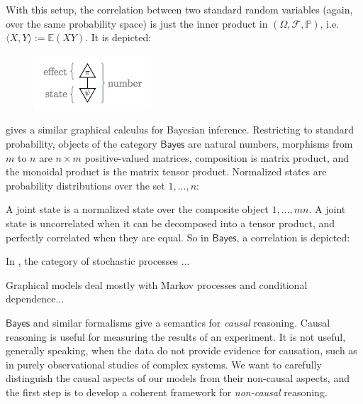 \documentclass{sig-alternate-05-2015}
\theoremstyle{plain}
\theoremstyle{plain}
\theoremstyle{remark}
\newcommand{\Cat}[1]{\mathsf{#1}}
\def\Bayes{\Cat{Bayes}}
\begin{document}
With this setup, the correlation between two standard random variables (again, over the same probability space) is just the inner product in $(\Omega, \mathcal{F}, \mathbb{P})$, i.e. $\langle X, Y \rangle := \mathbb{E}(XY)$. It is depicted:
\begin{figure}[h!]
\centering
\includegraphics{innerproduct}
\end{figure}

\cite{coecke_spekkens} gives a similar graphical calculus for Bayesian inference. Restricting to standard probability, objects of the category $\Bayes$ are natural numbers, morphisms from $m$ to $n$ are $n \times m$ positive-valued matrices, composition is matrix product, and the monoidal product is the matrix tensor product. Normalized states are probability distributions over the set ${1, ..., n}$:

\begin{figure}[h!]
\label{bob_normalized_state}
\end{figure}

A joint state is a normalized state over the composite object ${1, ..., mn}$. A joint state is uncorrelated when it can be decomposed into a tensor product, and perfectly correlated when they are equal. So in $\Bayes$, a correlation is depicted:

\begin{figure}[h!]
\label{bob_uncorrelated_state}
\end{figure}

\begin{figure}[h!]
\label{bob_correlated_state}
\end{figure}

In \cite{lawvere}, the category of stochastic processes ...

Graphical models \cite{lauritzen} deal mostly with Markov processes and conditional dependence... 

$\Bayes$ and similar formalisms \cite{fong} give a semantics for \emph{causal} reasoning. Causal reasoning is useful for measuring the results of an experiment. It is not useful, generally speaking, when the data do not provide evidence for causation, such as in purely observational studies of complex systems. We want to carefully distinguish the causal aspects of our models from their non-causal aspects, and the first step is to develop a coherent framework for \emph{non-causal} reasoning. %
\end{document}
